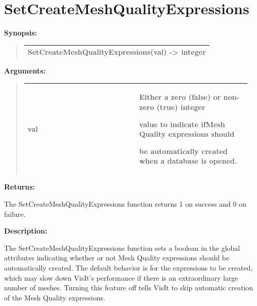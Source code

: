 \documentclass[letterpaper,10pt,english]{sphinxmanual}
\begin{document}
\section{SetCreateMeshQualityExpressions}
\label{functions:setcreatemeshqualityexpressions}
\begin{DUlineblock}{0em}
\item[] \textbf{Synopsis:}
\end{DUlineblock}
\begin{quote}

\begin{tabulary}{\linewidth}{|L|}
\hline

SetCreateMeshQualityExpressions(val) -\textgreater{} integer
\\
\hline\end{tabulary}

\end{quote}

\begin{DUlineblock}{0em}
\item[] 
\item[] \textbf{Arguments:}
\end{DUlineblock}
\begin{quote}

\begin{tabular}{|p{0.475\linewidth}|p{0.475\linewidth}|}
\hline

val
 & 
\begin{DUlineblock}{0em}
\item[] Either a zero (false) or non-zero (true) integer
\item[] value to indicate ifMesh Quality expressions should
\item[] be automatically created when a database is opened.
\end{DUlineblock}
\\
\hline\end{tabular}

\end{quote}

\begin{DUlineblock}{0em}
\item[] 
\item[] \textbf{Returns:}
\item[] The SetCreateMeshQualityExpressions function returns 1 on success and 0 on failure.
\item[] 
\item[] \textbf{Description:}
\item[] The SetCreateMeshQualityExpressions function sets a boolean in the
global attributes indicating whether or not Mesh Quality expressions
should be automatically created. The default behavior is for the
expressions to be created, which may slow down VisIt's performance
if there is an extraordinary large number of meshes.  Turning this
feature off tells VisIt to skip automatic creation of the Mesh Quality
expressions.
\end{DUlineblock}
\end{document}
